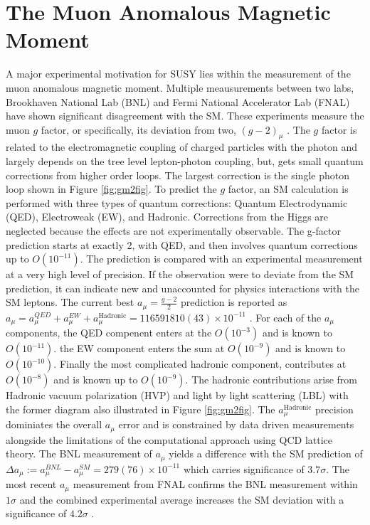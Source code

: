 \section{The Muon Anomalous Magnetic Moment}

A major experimental motivation for SUSY lies within the measurement of the muon anomalous magnetic moment.  Multiple meausurements between two labs, Brookhaven National Lab (BNL) and Fermi National Accelerator Lab (FNAL) have shown significant disagreement with the SM. These experiments measure the muon $g$ factor, or specifically, its deviation from two, $(g-2)_\mu$ .  The $g$ factor is related to the electromagnetic coupling of charged particles with the photon and largely depends on the tree level lepton-photon coupling, but, gets small quantum corrections from higher order loops. The largest correction is the single photon loop shown in Figure \ref{fig:gm2fig}. To predict the $g$ factor, an SM calculation is performed with three types of quantum corrections: Quantum Electrodynamic (QED), Electroweak (EW), and Hadronic. Corrections from the Higgs are neglected because the effects are not experimentally observable. %
The g-factor prediction starts at exactly 2, with QED, and then involves quantum corrections up to $O(10^{-11})$. The prediction is compared with an experimental measurement at a very high level of precision. If the observation were to deviate from the SM prediction, it can indicate new and unaccounted for physics interactions with the SM leptons.
The current best $a_\mu = \frac{g-2}{2}$ prediction is reported as $a_\mu= a_\mu^{QED}+ a_\mu^{EW}+a_\mu^{\text{Hadronic}} =  116 591 810(43) \times 10^{-11}$ \cite{Muong-2:2021ojo}.
 For each of the $a_\mu$ components, the QED compenent enters at the $O(10^{-3})$ and is known to $O(10^{-11})$. the EW component enters the sum at $O(10^{-9})$ and is known to $O(10^{-10})$. Finally the most complicated hadronic component, contributes at $O(10^{-8})$ and is known up to $O(10^{-9})$. The hadronic contributions arise from Hadronic vacuum polarization (HVP) and light by light scattering (LBL) with the former diagram also illustrated in Figure \ref{fig:gm2fig}. The $a_\mu^{\text{Hadronic}}$ precision dominiates the overall $a_\mu$ error and is constrained by data driven measurements alongside the limitations of the computational approach using QCD lattice theory. The BNL measurement of $a_\mu$ yields a difference with the SM prediction of $\Delta a_\mu := a_\mu^{BNL} - a_\mu^{SM} = 279(76) \times 10^{-11}$ which carries significance of $3.7\sigma$. The most recent $a_\mu$ measurement from FNAL confirms the BNL measurement within $1\sigma$ and the combined experimental average increases the SM deviation with a significance of $4.2\sigma$ \cite{Muong-2:2021ojo}.


